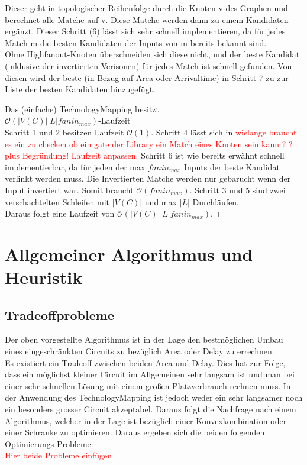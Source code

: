 \documentclass[11pt, a4paper, german]{article}
\newcommand{\TM}{TechnologyMapping }
\begin{document}
Dieser geht in topologischer Reihenfolge durch die Knoten v des Graphen und berechnet alle Matche auf v. Diese Matche werden dann zu einem Kandidaten ergänzt. Dieser Schritt (6) lässt sich sehr schnell implementieren, da für jedes Match m die besten Kandidaten der Inputs von m bereits bekannt sind.\\
 Ohne Highfanout-Knoten überschneiden sich diese nicht, und der beste Kandidat (inklusive der invertierten Verisonen) für jedes Match ist schnell gefunden. Von diesen wird der beste (in Bezug auf Area oder Arrivaltime) in Schritt 7 zu zur Liste der besten Kandidaten hinzugefügt.\\
 
\begin{cor}{Das (einfache) \TM besitzt \\ $\mathcal{O}(  |V(C)||L| fanin_{max})$-Laufzeit}\\
 	  Schritt 1 und 2 besitzen Laufzeit $\mathcal{O}(1)$. Schritt 4 lässt sich in \textcolor{red}{ wielange braucht es ein zu checken ob ein gate der Library ein Match eines Knoten sein kann ? ? plus Begründung! Laufzeit anpassen}. Schritt 6 ist wie bereits erwähnt schnell implementierbar, da für jeden der max $fanin_{max}$ Inputs der beste Kandidat verlinkt werden muss. Die Invertierten Matche werden nur gebarucht wenn der Input invertiert war. Somit braucht $\mathcal{O}(fanin_{max})$. Schritt 3 und 5 sind zwei verschachtelten Schleifen mit  $|V(C)|$ und max $|L|$ Durchläufen. \\
Daraus folgt eine Laufzeit von $\mathcal{O}(  |V(C)||L| fanin_{max})$. \hfill $\Box$
\end{cor}


\newpage
\section{Allgemeiner Algorithmus und Heuristik}
\subsection{Tradeoffprobleme}
Der oben vorgestellte Algorithmus ist in der Lage den bestmöglichen Umbau eines eingeschränkten Circuits zu bezüglich Area oder Delay zu errechnen. \\
Es existiert  ein Tradeoff zwischen beiden Area und Delay. Dies hat zur Folge, dass ein möglichst kleiner Circuit im Allgemeinen sehr langsam ist und man bei einer sehr schnellen Lösung mit einem großen Platzverbrauch rechnen muss. In der Anwendung des \TM ist jedoch weder ein sehr langsamer noch ein besonders grosser Circuit akzeptabel. Daraus folgt die Nachfrage nach einem Algorithmus, welcher in der Lage ist bezüglich einer Konvexkombination oder einer Schranke zu optimieren. Daraus ergeben sich die beiden folgenden Optimierungs-Probleme: \\
\textcolor{red}{Hier beide Probleme einfügen}\\
\end{document}
